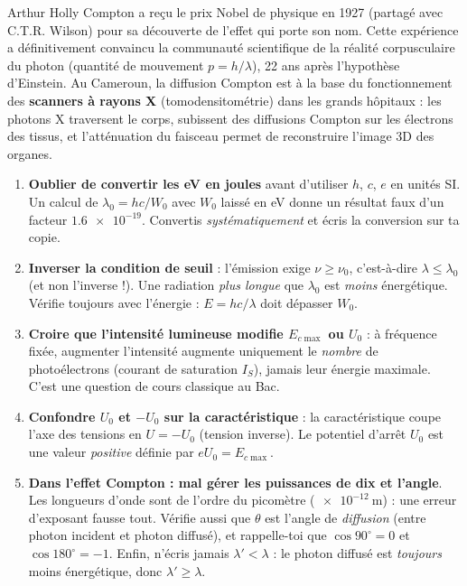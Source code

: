 \documentclass[11pt]{article}
\begin{document}
\begin{savaistu}
Arthur Holly Compton a reçu le prix Nobel de physique en 1927 (partagé avec C.T.R. Wilson) pour sa découverte de l'effet qui porte son nom. Cette expérience a définitivement convaincu la communauté scientifique de la réalité corpusculaire du photon (quantité de mouvement $p = h/\lambda$), 22 ans après l'hypothèse d'Einstein. Au Cameroun, la diffusion Compton est à la base du fonctionnement des \textbf{scanners à rayons X} (tomodensitométrie) dans les grands hôpitaux : les photons X traversent le corps, subissent des diffusions Compton sur les électrons des tissus, et l'atténuation du faisceau permet de reconstruire l'image 3D des organes.
\end{savaistu}

\begin{attention}
\begin{enumerate}
\item \textbf{Oublier de convertir les eV en joules} avant d'utiliser $h$, $c$, $e$ en unités SI. Un calcul de $\lambda_0 = hc/W_0$ avec $W_0$ laissé en eV donne un résultat faux d'un facteur $\num{1,6e-19}$. Convertis \emph{systématiquement} et écris la conversion sur ta copie.
\item \textbf{Inverser la condition de seuil} : l'émission exige $\nu \geq \nu_0$, c'est-à-dire $\lambda \leq \lambda_0$ (et non l'inverse !). Une radiation \emph{plus longue} que $\lambda_0$ est \emph{moins} énergétique. Vérifie toujours avec l'énergie : $E = hc/\lambda$ doit dépasser $W_0$.
\item \textbf{Croire que l'intensité lumineuse modifie $E_{c\max}$ ou $U_0$} : à fréquence fixée, augmenter l'intensité augmente uniquement le \emph{nombre} de photoélectrons (courant de saturation $I_S$), jamais leur énergie maximale. C'est une question de cours classique au Bac.
\item \textbf{Confondre $U_0$ et $-U_0$ sur la caractéristique} : la caractéristique coupe l'axe des tensions en $U = -U_0$ (tension inverse). Le potentiel d'arrêt $U_0$ est une valeur \emph{positive} définie par $eU_0 = E_{c\max}$.
\item \textbf{Dans l'effet Compton : mal gérer les puissances de dix et l'angle}. Les longueurs d'onde sont de l'ordre du picomètre ($\num{e-12}\ \text{m}$) : une erreur d'exposant fausse tout. Vérifie aussi que $\theta$ est l'angle de \emph{diffusion} (entre photon incident et photon diffusé), et rappelle-toi que $\cos 90^{\circ} = 0$ et $\cos 180^{\circ} = -1$. Enfin, n'écris jamais $\lambda' < \lambda$ : le photon diffusé est \emph{toujours} moins énergétique, donc $\lambda' \geq \lambda$.
\end{enumerate}
\end{attention}
\end{document}
